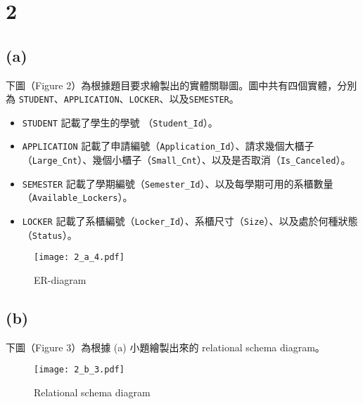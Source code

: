 \documentclass{article}
\begin{document}
\section*{2}
\subsection*{(a)}
下圖（Figure 2）為根據題目要求繪製出的實體關聯圖。圖中共有四個實體，分別為 \texttt{STUDENT}、\texttt{APPLICATION}、\texttt{LOCKER}、以及\texttt{SEMESTER}。
\begin{itemize}
\item \texttt{STUDENT} 記載了學生的學號 （\texttt{Student\_Id}）。
\item \texttt{APPLICATION} 記載了申請編號（\texttt{Application\_Id}）、請求幾個大櫃子（\texttt{Large\_Cnt}）、幾個小櫃子（\texttt{Small\_Cnt}）、以及是否取消（\texttt{Is\_Canceled}）。
\item \texttt{SEMESTER} 記載了學期編號（\texttt{Semester\_Id}）、以及每學期可用的系櫃數量（\texttt{Available\_Lockers}）。 
\item \texttt{LOCKER} 記載了系櫃編號（\texttt{Locker\_Id}）、系櫃尺寸（\texttt{Size}）、以及處於何種狀態（\texttt{Status}）。
\end{itemize}
\begin{figure}[H] %
    \centering
    \texttt{[image: 2\_a\_4.pdf]} %
    \caption{ER-diagram} %
\end{figure}

\subsection*{(b)}
下圖（Figure 3）為根據 (a) 小題繪製出來的 relational schema diagram。
\begin{figure}[H] %
    \centering
    \texttt{[image: 2\_b\_3.pdf]} %
    \caption{Relational schema diagram} %
\end{figure}
\end{document}
